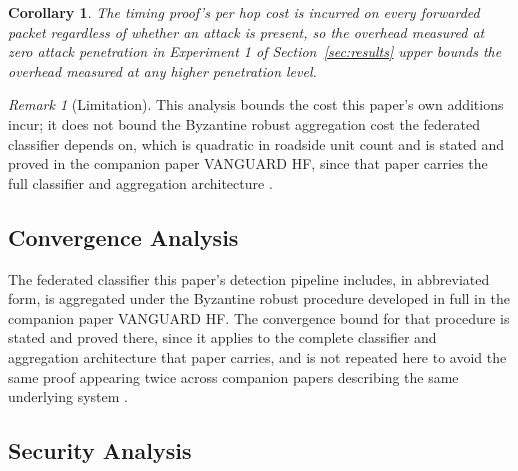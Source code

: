 \documentclass[final,5p,twocolumn]{elsarticle}
\newtheorem{corollary}[lemma]{Corollary}
\theoremstyle{remark}
\newtheorem{remark}{Remark}
\theoremstyle{plain}
\begin{document}
\begin{corollary}
	The timing proof's per hop cost is incurred on every forwarded packet
	regardless of whether an attack is present, so the overhead measured at
	zero attack penetration in Experiment 1 of Section~\ref{sec:results}
	upper bounds the overhead measured at any higher penetration level.
\end{corollary}

\begin{remark}[Limitation]
	This analysis bounds the cost this paper's own additions incur; it does
	not bound the Byzantine robust aggregation cost the federated
	classifier depends on, which is quadratic in roadside unit count and is
	stated and proved in the companion paper VANGUARD HF, since that paper
	carries the full classifier and aggregation architecture
	\cite{VanguardHF2026}.
\end{remark}

\subsection{Convergence Analysis}
\label{app:convergence}

The federated classifier this paper's detection pipeline includes, in
abbreviated form, is aggregated under the Byzantine robust procedure
developed in full in the companion paper VANGUARD HF. The convergence
bound for that procedure is stated and proved there, since it applies to
the complete classifier and aggregation architecture that paper carries,
and is not repeated here to avoid the same proof appearing twice across
companion papers describing the same underlying system
\cite{VanguardHF2026}.

\subsection{Security Analysis}
\label{app:security}
\end{document}
